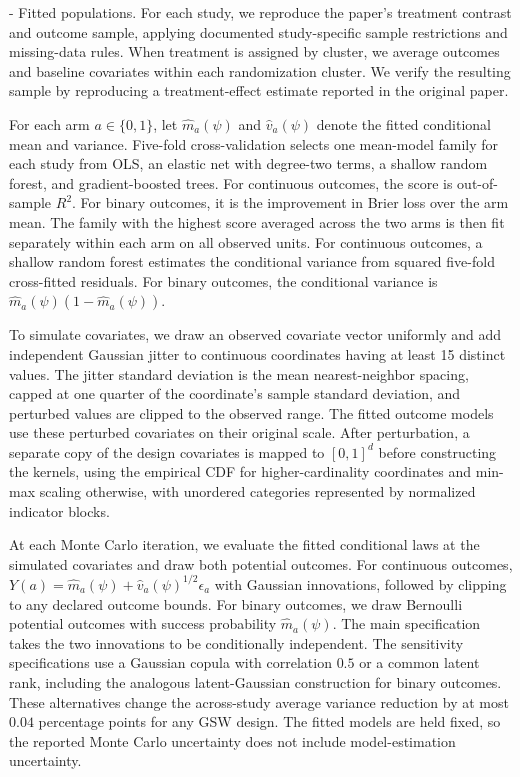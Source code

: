 \documentclass[letterpaper,12pt]{article}
\makeatletter
\theoremstyle{definition}
\numberwithin{equation}{section}
\renewcommand{\paragraph}{\@startsection{paragraph}{4}{\z@}%
  {\medskipamount}%
  {-\fontdimen2\font}%
  {\normalfont\normalsize\bfseries}}
\makeatother
\begin{document}
\paragraph{Fitted populations.}
For each study, we reproduce the paper's treatment contrast and outcome sample, applying documented study-specific sample restrictions and missing-data rules.
When treatment is assigned by cluster, we average outcomes and baseline covariates within each randomization cluster.
We verify the resulting sample by reproducing a treatment-effect estimate reported in the original paper.

For each arm $a\in\{0,1\}$, let $\widehat m_a(\psi)$ and $\widehat v_a(\psi)$ denote the fitted conditional mean and variance.
Five-fold cross-validation selects one mean-model family for each study from OLS, an elastic net with degree-two terms, a shallow random forest, and gradient-boosted trees.
For continuous outcomes, the score is out-of-sample $R^2$.
For binary outcomes, it is the improvement in Brier loss over the arm mean.
The family with the highest score averaged across the two arms is then fit separately within each arm on all observed units.
For continuous outcomes, a shallow random forest estimates the conditional variance from squared five-fold cross-fitted residuals.
For binary outcomes, the conditional variance is $\widehat m_a(\psi)(1-\widehat m_a(\psi))$.

To simulate covariates, we draw an observed covariate vector uniformly and add independent Gaussian jitter to continuous coordinates having at least 15 distinct values.
The jitter standard deviation is the mean nearest-neighbor spacing, capped at one quarter of the coordinate's sample standard deviation, and perturbed values are clipped to the observed range.
The fitted outcome models use these perturbed covariates on their original scale.
After perturbation, a separate copy of the design covariates is mapped to $[0,1]^d$ before constructing the kernels, using the empirical CDF for higher-cardinality coordinates and min-max scaling otherwise, with unordered categories represented by normalized indicator blocks.

At each Monte Carlo iteration, we evaluate the fitted conditional laws at the simulated covariates and draw both potential outcomes.
For continuous outcomes, $Y(a)=\widehat m_a(\psi)+\widehat v_a(\psi)^{1/2}\epsilon_a$ with Gaussian innovations, followed by clipping to any declared outcome bounds.
For binary outcomes, we draw Bernoulli potential outcomes with success probability $\widehat m_a(\psi)$.
The main specification takes the two innovations to be conditionally independent.
The sensitivity specifications use a Gaussian copula with correlation $0.5$ or a common latent rank, including the analogous latent-Gaussian construction for binary outcomes.
These alternatives change the across-study average variance reduction by at most $0.04$ percentage points for any GSW design.
The fitted models are held fixed, so the reported Monte Carlo uncertainty does not include model-estimation uncertainty.
\end{document}
